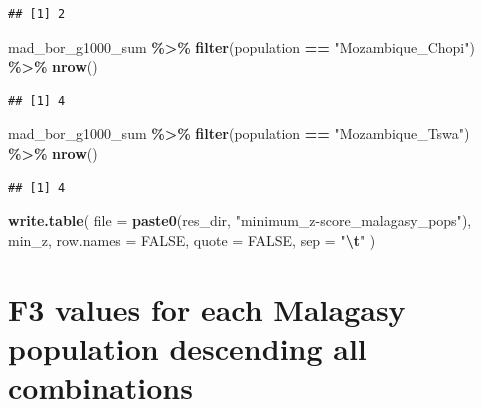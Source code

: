 \documentclass[
]{article}
\newenvironment{Shaded}{\begin{snugshade}}{\end{snugshade}}
\newcommand{\AttributeTok}[1]{\textcolor[rgb]{0.13,0.29,0.53}{#1}}
\newcommand{\ConstantTok}[1]{\textcolor[rgb]{0.56,0.35,0.01}{#1}}
\newcommand{\FunctionTok}[1]{\textcolor[rgb]{0.13,0.29,0.53}{\textbf{#1}}}
\newcommand{\NormalTok}[1]{#1}
\newcommand{\SpecialCharTok}[1]{\textcolor[rgb]{0.81,0.36,0.00}{\textbf{#1}}}
\newcommand{\StringTok}[1]{\textcolor[rgb]{0.31,0.60,0.02}{#1}}
\begin{document}
\begin{verbatim}
## [1] 2
\end{verbatim}

\begin{Shaded}
\begin{Highlighting}[]
\NormalTok{mad\_bor\_g1000\_sum }\SpecialCharTok{\%\textgreater{}\%}
  \FunctionTok{filter}\NormalTok{(population }\SpecialCharTok{==} \StringTok{"Mozambique\_Chopi"}\NormalTok{) }\SpecialCharTok{\%\textgreater{}\%}
  \FunctionTok{nrow}\NormalTok{()}
\end{Highlighting}
\end{Shaded}

\begin{verbatim}
## [1] 4
\end{verbatim}

\begin{Shaded}
\begin{Highlighting}[]
\NormalTok{mad\_bor\_g1000\_sum }\SpecialCharTok{\%\textgreater{}\%}
  \FunctionTok{filter}\NormalTok{(population }\SpecialCharTok{==} \StringTok{"Mozambique\_Tswa"}\NormalTok{) }\SpecialCharTok{\%\textgreater{}\%}
  \FunctionTok{nrow}\NormalTok{()}
\end{Highlighting}
\end{Shaded}

\begin{verbatim}
## [1] 4
\end{verbatim}

\begin{Shaded}
\begin{Highlighting}[]
\FunctionTok{write.table}\NormalTok{(}
  \AttributeTok{file =} \FunctionTok{paste0}\NormalTok{(res\_dir, }\StringTok{"minimum\_z{-}score\_malagasy\_pops"}\NormalTok{),}
\NormalTok{  min\_z, }\AttributeTok{row.names =} \ConstantTok{FALSE}\NormalTok{, }\AttributeTok{quote =} \ConstantTok{FALSE}\NormalTok{, }\AttributeTok{sep =} \StringTok{"}\SpecialCharTok{\textbackslash{}t}\StringTok{"}
\NormalTok{)}
\end{Highlighting}
\end{Shaded}

\section{F3 values for each Malagasy population descending all
combinations}\label{f3-values-for-each-malagasy-population-descending-all-combinations}
\end{document}
